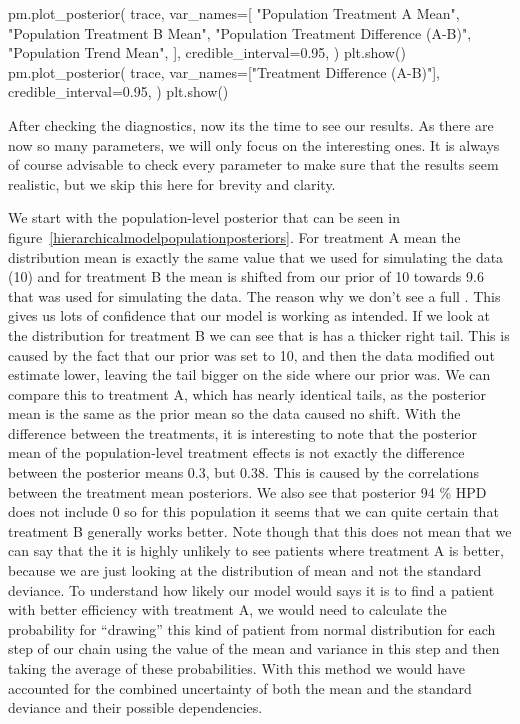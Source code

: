 \documentclass[12pt,a4paper,leqno]{report}
\theoremstyle{plain}
\theoremstyle{definition}
\theoremstyle{remark}
\begin{document}
\bigskip
\begin{pyverbatim}[][fontsize=\footnotesize]
    pm.plot_posterior(
        trace,
        var_names=[
            "Population Treatment A Mean",
            "Population Treatment B Mean",
            "Population Treatment Difference (A-B)",
            "Population Trend Mean",
        ],
        credible_interval=0.95,
    )
    plt.show()
    pm.plot_posterior(
        trace,
        var_names=["Treatment Difference (A-B)"],
        credible_interval=0.95,
    )
    plt.show()
\end{pyverbatim}
\smallskip

After checking the diagnostics, now its the time to see our results. As there are
now so many parameters, we will only focus on the interesting ones. It is always of
course advisable to check every parameter to make sure that the results seem realistic,
but we skip this here for brevity and clarity.

We start with the population-level posterior that can be seen in figure\
\ref{hierarchicalmodelpopulationposteriors}. For treatment A mean the
distribution mean is exactly the same value that we used for simulating the data (10)
and for treatment B the mean is shifted from our prior of 10 towards 9.6 that was used for
simulating the data. The reason why we don't see a full
. This gives us lots of confidence that our
model is working as intended. If we look at the distribution for treatment B we can see
that is has a thicker right tail. This is caused by the fact that our prior was set to
10, and then the data modified out estimate lower, leaving the tail bigger on the side
where our prior was. We can compare this to treatment A, which has nearly identical
tails, as the posterior mean is the same as the prior mean so the data caused no
shift. With the difference between the treatments, it is interesting to note that the
posterior mean of the population-level treatment effects is not exactly the difference
between the posterior means 0.3, but 0.38. This is caused by the correlations between
the treatment mean posteriors. We also see that posterior 94 \% HPD does not include 0
so for this population it seems that we can quite certain that treatment B
generally works better. Note though that this does not mean that we can say that the it is highly
unlikely to see patients where treatment A is better, because we are just looking at the
distribution of mean and not the standard deviance.
To understand how likely our model
would says it is to find a patient with better efficiency with treatment A, we would need
to calculate the probability for ``drawing'' this kind of patient from normal
distribution for each step of our chain using the value of the mean and variance in this
step and then taking the average of these probabilities. With this method we would have
accounted for the combined uncertainty of both the mean and the standard deviance and
their possible dependencies.
\end{document}
